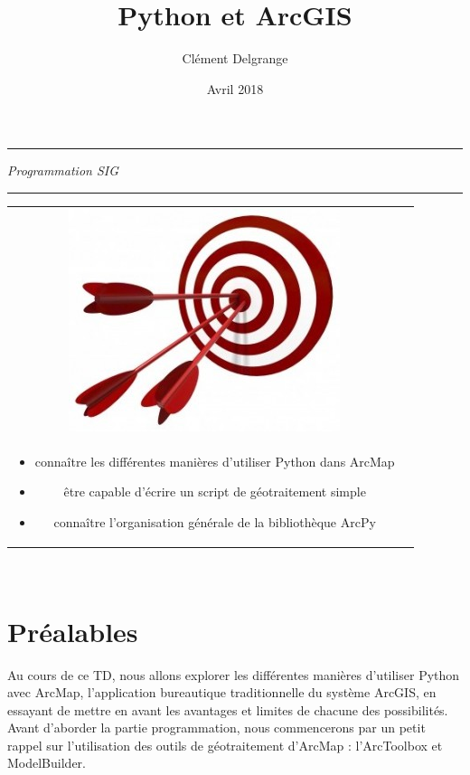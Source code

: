 \documentclass[11pt]{article}
\title{Python et ArcGIS}
\author{Clément Delgrange}
\date{Avril 2018}
\newenvironment{objectifs}{
	\begin{lrbox}{\mybox}
		\begin{minipage}{0.9\textwidth}
			\vspace{1em}
			\begin{tabular}[t t]{c c}
				\includegraphics[width=0.1\linewidth]{img/goals.jpg} &
				\begin{minipage}[c]{0.8\linewidth}
					\hspace{2em}\textbf{\large{Objectifs :}} \\
}{
				\end{minipage}
			\end{tabular}
			\vspace{1em}
		\end{minipage}
	\end{lrbox}
	\fbox{\usebox{\mybox}}
}
\begin{document}
\parindent=0cm


\begin{titlepage}
\makeatletter
	\begin{sffamily}
		\begin{flushleft}
		\end{flushleft}
		\begin{flushright}
		\end{flushright}

		\vspace{4cm}

		\begin{center}
			\hrule
				\vspace{1em}
				{\small \textit{Programmation SIG}}\\
				\vspace{0.5cm}
				{\huge\bfseries \@title}
				\vspace{1cm}
			\hrule

			\vspace{4cm}
			\begin{objectifs}
				\begin{itemize}
					\item connaître les différentes manières d'utiliser Python dans 		ArcMap
					\item être capable d'écrire un script de géotraitement simple
					\item connaître l'organisation générale de la bibliothèque ArcPy
				\end{itemize}
			\end{objectifs}
			\vspace{3cm}

			\large \textit{\@author}\\
			\small \textit{\@date}
		\end{center}
	\end{sffamily}
\makeatother
\end{titlepage}


\section*{Préalables}
Au cours de ce TD, nous allons explorer les différentes manières d'utiliser Python avec ArcMap, l'application bureautique traditionnelle du système ArcGIS, en essayant de mettre en avant les avantages et limites de chacune des possibilités. Avant d'aborder la partie programmation, nous commencerons par un petit rappel sur l'utilisation des outils de géotraitement d'ArcMap : l'ArcToolbox et ModelBuilder.
\end{document}
